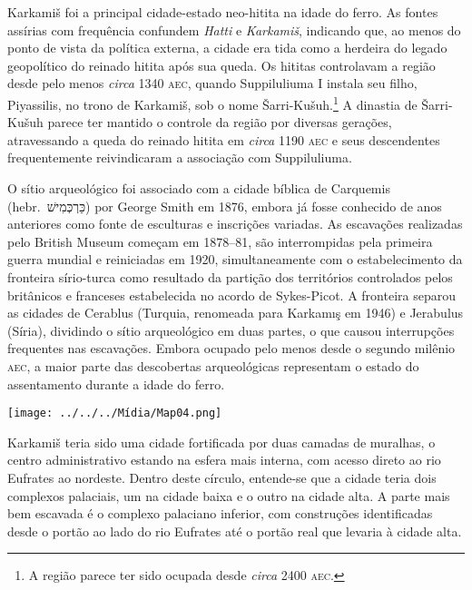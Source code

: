 
Karkamiš foi a principal cidade-estado neo-hitita na idade do ferro.
As fontes assírias com frequência confundem \emph{Hatti} e \emph{Karkamiš},
indicando que, ao menos do ponto de vista da política externa, a cidade era tida
como a herdeira do legado geopolítico do reinado hitita após sua queda.
Os hititas controlavam a região desde pelo menos \emph{circa} 1340 \textsc{aec},
quando Suppiluliuma I instala seu filho, Piyassilis, no trono de Karkamiš, sob o
nome Šarri-Kušuh.\footnote{A região parece ter sido ocupada desde \emph{circa}
	2400 \textsc{aec}.}
A dinastia de Šarri-Kušuh parece ter mantido o controle da região por diversas
gerações, atravessando a queda do reinado hitita em \emph{circa} 1190
\textsc{aec} e seus descendentes frequentemente reivindicaram a associação com
Suppiluliuma.

O sítio arqueológico foi associado com a cidade bíblica de Carquemis (hebr.\
\foreignlanguage{hebrew}{כַּרְכְּמִישׁ}) por George Smith em 1876, embora já fosse
conhecido de anos anteriores como fonte de esculturas e inscrições variadas.
As escavações realizadas pelo British Museum começam em 1878--81, são
interrompidas pela primeira guerra mundial e reiniciadas em 1920,
simultaneamente com o estabelecimento da fronteira sírio-turca como resultado da
partição dos territórios controlados pelos britânicos e franceses estabelecida
no acordo de Sykes-Picot.
A fronteira separou as cidades de Cerablus (Turquia, renomeada para Karkamış em
1946) e Jerabulus (Síria), dividindo o sítio arqueológico em duas partes, o
que causou interrupções frequentes nas escavações.
Embora ocupado pelo menos desde o segundo milênio \textsc{aec}, a maior parte
das descobertas arqueológicas representam o estado do assentamento durante
a idade do ferro.




\begin{center}
	\texttt{[image: ../../../Mídia/Map04.png]}
\end{center}

\clearpage

Karkamiš teria sido uma cidade fortificada por duas camadas de muralhas, o
centro administrativo estando na esfera mais interna, com acesso direto ao rio
Eufrates ao nordeste.
Dentro deste círculo, entende-se que a cidade teria dois complexos palaciais, um
na cidade baixa e o outro na cidade alta.
A parte mais bem escavada é o complexo palaciano inferior, com
construções identificadas desde o portão ao lado do rio Eufrates até o portão
real que levaria à cidade alta.

